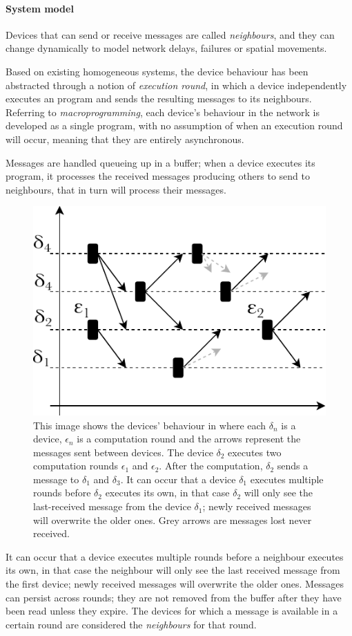 \paragraph{System model}
Devices that can send or receive messages are called \emph{neighbours}, and they can change dynamically to model network
delays, failures or spatial movements.

Based on existing homogeneous systems, the device behaviour has been abstracted through a notion of \emph{execution round},
in which a device independently executes an \xc{} program and sends the resulting messages to its neighbours.
Referring to \emph{macroprogramming}, each device's behaviour in the network is developed as a single program, with no
assumption of when an execution round will occur, meaning that they are entirely asynchronous.

Messages are handled queueing up in a buffer; when a device executes its \xc{} program, it processes the received
messages producing others to send to neighbours, that in turn will process their messages.

\begin{figure}
    \centering
    \includegraphics[width=.5\linewidth]{figures/xc-system-model}
    \caption{This image shows the devices' behaviour in \xc{} where each $\delta_n$ is a device, $\epsilon_n$ is a computation round
        and the arrows represent the messages sent between devices.
        The device $\delta_2$ executes two computation rounds $\epsilon_1$ and $\epsilon_2$.
        After the computation, $\delta_2$ sends a message to $\delta_1$ and $\delta_3$.
        It can occur that a device $\delta_1$ executes multiple rounds before $\delta_2$ executes its own, in that case $\delta_2$ will
        only see the last-received message from the device $\delta_1$; newly received messages will overwrite the older ones.
        Grey arrows are messages lost never received.
    }
    \label{fig:xc-system-model}
\end{figure}

It can occur that a device executes multiple rounds before a neighbour executes its own, in that case the neighbour will
only see the last received message from the first device; newly received messages will overwrite the older ones.
Messages can persist across rounds; they are not removed from the buffer after they have been read unless they expire.
The devices for which a message is available in a certain round are considered the \emph{neighbours} for that round.

